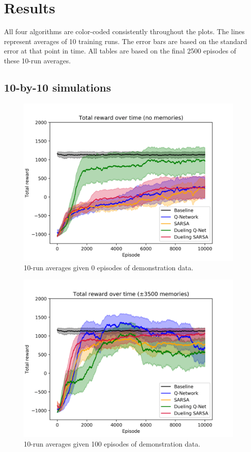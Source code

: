 
\section{Results}
All four algorithms are color-coded consistently throughout the plots. The lines represent averages of 10 training runs. The error bars are based on the standard error at that point in time. All tables are based on the final 2500 episodes of these 10-run averages.
\subsection{10-by-10 simulations}
\begin{figure}[H]
    \centering
    \includegraphics[width=\linewidth]{img/results/10-sized/total_rewards_0m-min.png}
    \caption{10-run averages given 0 episodes of demonstration data.}
    \label{fig:10sized-nomem}
\end{figure}
\begin{figure}[H]
    \centering
    \includegraphics[width=\linewidth]{img/results/10-sized/total_rewards_100m-min.png}
    \caption{10-run averages given 100 episodes of demonstration data.}
    \label{fig:10sized-100mem}
\end{figure}
